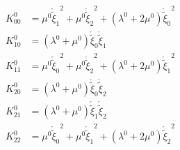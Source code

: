 \begin{equation}\begin{aligned}
K^0_{00} &= \mu^{0} {{\mathring{{\widetilde{{\xi}}}}}_{1}}^{2} + \mu^{0} {{\mathring{{\widetilde{{\xi}}}}}_{2}}^{2} + \left(\lambda^{0} + 2 \mu^{0}\right) {{\mathring{{\widetilde{{\xi}}}}}_{0}}^{2}\\
K^0_{10} &= \left(\lambda^{0} + \mu^{0}\right) {{\mathring{{\widetilde{{\xi}}}}}_{0}} {{\mathring{{\widetilde{{\xi}}}}}_{1}}\\
K^0_{11} &= \mu^{0} {{\mathring{{\widetilde{{\xi}}}}}_{0}}^{2} + \mu^{0} {{\mathring{{\widetilde{{\xi}}}}}_{2}}^{2} + \left(\lambda^{0} + 2 \mu^{0}\right) {{\mathring{{\widetilde{{\xi}}}}}_{1}}^{2}\\
K^0_{20} &= \left(\lambda^{0} + \mu^{0}\right) {{\mathring{{\widetilde{{\xi}}}}}_{0}} {{\mathring{{\widetilde{{\xi}}}}}_{2}}\\
K^0_{21} &= \left(\lambda^{0} + \mu^{0}\right) {{\mathring{{\widetilde{{\xi}}}}}_{1}} {{\mathring{{\widetilde{{\xi}}}}}_{2}}\\
K^0_{22} &= \mu^{0} {{\mathring{{\widetilde{{\xi}}}}}_{0}}^{2} + \mu^{0} {{\mathring{{\widetilde{{\xi}}}}}_{1}}^{2} + \left(\lambda^{0} + 2 \mu^{0}\right) {{\mathring{{\widetilde{{\xi}}}}}_{2}}^{2}\\
\end{aligned}\end{equation}

